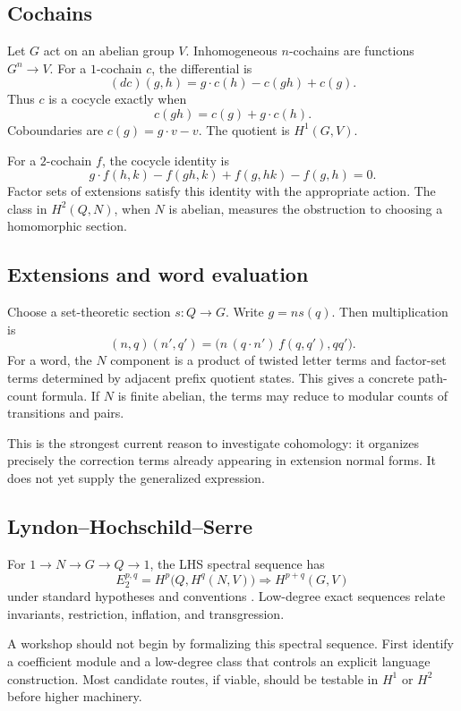 \documentclass{amsart}
\begin{document}
\subsection{Cochains}

Let $G$ act on an abelian group $V$.  Inhomogeneous $n$-cochains are functions $G^n\to V$.  For a $1$-cochain $c$, the differential is
\[
  (dc)(g,h)=g\cdot c(h)-c(gh)+c(g).
\]
Thus $c$ is a cocycle exactly when
\[
  c(gh)=c(g)+g\cdot c(h).
\]
Coboundaries are $c(g)=g\cdot v-v$.  The quotient is $H^1(G,V)$.

For a $2$-cochain $f$, the cocycle identity is
\[
 g\cdot f(h,k)-f(gh,k)+f(g,hk)-f(g,h)=0.
\]
Factor sets of extensions satisfy this identity with the appropriate action.  The class in $H^2(Q,N)$, when $N$ is abelian, measures the obstruction to choosing a homomorphic section.

\subsection{Extensions and word evaluation}

Choose a set-theoretic section $s:Q\to G$.  Write $g=n s(q)$.  Then multiplication is
\[
(n,q)(n',q')=
\bigl(n\,(q\cdot n')\,f(q,q'),qq'\bigr).
\]
For a word, the $N$ component is a product of twisted letter terms and factor-set terms determined by adjacent prefix quotient states.  This gives a concrete path-count formula.  If $N$ is finite abelian, the terms may reduce to modular counts of transitions and pairs.

This is the strongest current reason to investigate cohomology: it organizes precisely the correction terms already appearing in extension normal forms.  It does not yet supply the generalized expression.

\subsection{Lyndon--Hochschild--Serre}

For $1\to N\to G\to Q\to1$, the LHS spectral sequence has
\[
  E_2^{p,q}=H^p\bigl(Q,H^q(N,V)\bigr)
  \Longrightarrow H^{p+q}(G,V)
\]
under standard hypotheses and conventions \cite{brown1982cohomology,weibel1994homological}.  Low-degree exact sequences relate invariants, restriction, inflation, and transgression.

A workshop should not begin by formalizing this spectral sequence.  First identify a coefficient module and a low-degree class that controls an explicit language construction.  Most candidate routes, if viable, should be testable in $H^1$ or $H^2$ before higher machinery.
\end{document}
